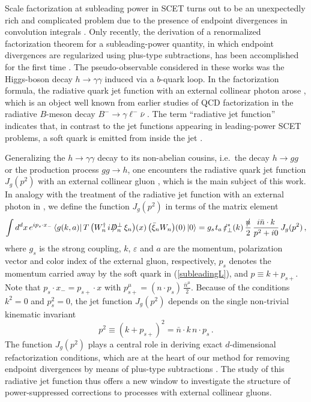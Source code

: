 \documentclass[12pt]{article}
\newcommand{\nsl}{\rlap{\hspace{0.25mm}/}{n}}
\newcommand{\Dsl}{\rlap{\hspace{0.75mm}/}{D}}
\newcommand{\spac}{{\hspace{0.3mm}}}
\numberwithin{equation}{section}
\begin{document}
Scale factorization at subleading power in SCET turns out to be an unexpectedly rich and complicated problem due to the presence of endpoint divergences in convolution integrals \cite{Moult:2019mog,Beneke:2019kgv,Moult:2019uhz,Beneke:2019oqx,Moult:2019vou,Liu:2019oav,Beneke:2020ibj}. Only recently, the derivation of a renormalized factorization theorem for a subleading-power quantity, in which endpoint divergences are regularized using plus-type subtractions, has been accomplished for the first time \cite{Liu:2019oav,Liu:2020tzd,Liu:2020wbn}. The pseudo-observable considered in these works was the Higgs-boson decay $h\to\gamma\gamma$ induced via a $b$-quark loop. In the factorization formula, the radiative quark jet function with an external collinear photon arose \cite{Liu:2020ydl}, which is an object well known from earlier studies of QCD factorization in the radiative $B$-meson decay $B^-\to\gamma\ell^-\bar\nu$ \cite{Lunghi:2002ju,Bosch:2003fc}. The term ``radiative jet function'' indicates that, in contrast to the jet functions appearing in leading-power SCET problems, a soft quark is emitted from inside the jet \cite{DelDuca:1990gz,Bonocore:2015esa,Bonocore:2016awd,Moult:2019mog}. 

Generalizing the $h\to\gamma\gamma$ decay to its non-abelian cousins, i.e.\ the decay $h\to gg$ or the production process $gg\to h$, one encounters the radiative quark jet function $J_g(p^2)$ with an external collinear gluon \cite{HiggsGluGlu}, which is the main subject of this work. In analogy with the treatment of the radiative jet function with an external photon in \cite{Liu:2020ydl}, we define the function $J_g(p^2)$ in terms of the matrix element 
\begin{equation}\label{defJg}
   \int d^dx\,e^{ip_s\cdot x_-}\,\langle g(k,a)|\,
    T\,\big( W_n^\dagger\,i\Dsl_n^\perp\,\xi_n \big)(x)\,\big( \bar\xi_n W_n \big)(0)\,|0\rangle 
   = g_s\spac t_a\,\rlap/\varepsilon_\perp^*(k)\,\frac{\nsl}{2}\,\frac{i\bar n\cdot k}{p^2+i0}\,J_g(p^2) \,, 
\end{equation}
where $g_s$ is the strong coupling, $k$, $\varepsilon$ and $a$ are the momentum, polarization vector and color index of the external gluon, respectively, $p_s$ denotes the momentum carried away by the soft quark in (\ref{subleadingL}), and $p\equiv k+p_{s+}$. Note that $p_s\cdot x_-=p_{s+}\cdot x$ with $p_{s+}^\mu=(n\cdot p_s)\,\frac{\bar n^\mu}{2}$. Because of the conditions $k^2=0$ and $p_s^2=0$, the jet function $J_g(p^2)$ depends on the single non-trivial kinematic invariant 
\begin{equation}
   p^2\equiv (k+p_{s+})^2 = \bar n\cdot k\,n\cdot p_s \,.
\end{equation}
The function $J_g(p^2)$ plays a central role in deriving exact $d$-dimensional refactorization conditions, which are at the heart of our method for removing endpoint divergences by means of plus-type subtractions \cite{Liu:2019oav,Liu:2020tzd,Liu:2020wbn}. The study of this radiative jet function thus offers a new window to investigate the structure of power-suppressed corrections to processes with external collinear gluons. 
\end{document}
